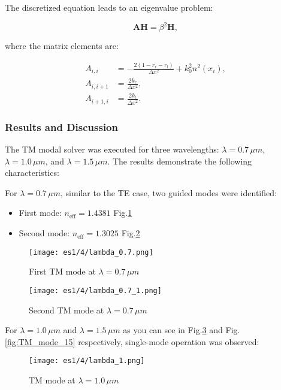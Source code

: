 \documentclass{article}
\begin{document}
The discretized equation leads to an eigenvalue problem:

\begin{equation}
\mathbf{A} \mathbf{H} = \beta^2 \mathbf{H},
\end{equation}

where the matrix elements are:

\begin{align}
A_{i,i} &= -\frac{2(1-r_r-r_l)}{\Delta x^2} + k_0^2 n^2(x_i), \\
A_{i,i+1} &= \frac{2k_r}{\Delta x^2}, \\
A_{i+1,i} &= \frac{2k_l}{\Delta x^2}.
\end{align}

\subsubsection{Results and Discussion}

The TM modal solver was executed for three wavelengths: $\lambda = 0.7\,\mu m$, $\lambda = 1.0\,\mu m$, and $\lambda = 1.5\,\mu m$. The results demonstrate the following characteristics:

For $\lambda = 0.7\,\mu m$, similar to the TE case, two guided modes were identified:
\begin{itemize}
\item First mode: $n_{\text{eff}} = 1.4381$ Fig.\ref{fig:TM_mode_07_1}
\item Second mode: $n_{\text{eff}} = 1.3025$ Fig.\ref{fig:TM_mode_07_2}
\end{itemize}

\begin{figure}[h]
\centering
\texttt{[image: es1/4/lambda\_0.7.png]}
\caption{First TM mode at $\lambda = 0.7\,\mu m$}
\label{fig:TM_mode_07_1}
\end{figure}

\begin{figure}[h]
\centering
\texttt{[image: es1/4/lambda\_0.7\_1.png]}
\caption{Second TM mode at $\lambda = 0.7\,\mu m$}
\label{fig:TM_mode_07_2}
\end{figure}

For $\lambda = 1.0\,\mu m$ and $\lambda = 1.5\,\mu m$ as you can see in Fig.\ref{fig:TM_mode_10} and Fig.\ref{fig:TM_mode_15} respectively, single-mode operation was observed:

\begin{figure}[h]
\centering
\texttt{[image: es1/4/lambda\_1.png]}
\caption{TM mode at $\lambda = 1.0\,\mu m$}
\label{fig:TM_mode_10}
\end{figure}
\end{document}
